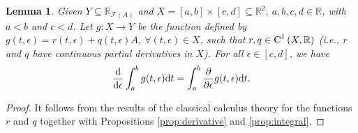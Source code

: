 \documentclass[12pt,a4paper]{article}
\newcommand{\RR}{\mathbb{R}}
\newcommand{\RFA}{\mathbb{R}_{\mathcal{F}(A)}}
\newtheorem{lemma}{Lemma}
\begin{document}
\begin{lemma}\label{inter}
Given $Y\subseteq\RFA$ and $X = \left[a,b\right]\times\left[c,d\right]\subseteq\RR^2$, $a,b,c,d\in\RR$, with $a<b$ and $c<d$. Let $g:X\longrightarrow Y$ be the function defined by $g(t,\epsilon)=r(t,\epsilon)+q(t,\epsilon)A$, $\forall (t,\epsilon) \in X$, such that $r,q\in\textnormal{C}^1\left(X,\RR\right)$ (i.e., $r$ and $q$ have continuous partial derivatives in $X$). For all $\epsilon \in\left[c,d\right]$, we have 
\begin{equation}\label{dint}
	\dfrac{\textnormal{d}}{\textnormal{d} \epsilon}\int_{a}^b g(t,\epsilon)\textnormal{d}t=\int_{a}^b\dfrac{\partial}{\partial\epsilon}g(t,\epsilon)\textnormal{d}t.
\end{equation}
\end{lemma}	
\begin{proof}
It follows from the results of the classical calculus theory for the functions $r$ and $q$ together  with Propositions \ref{prop:derivative} and \ref{prop:integral}. 
%

\end{proof}
\end{document}
